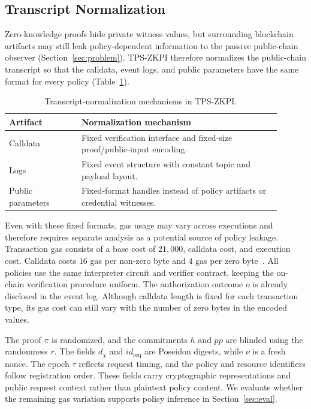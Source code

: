 \subsection{Transcript Normalization}
\label{subsec:transcript-normalization}

Zero-knowledge proofs hide private witness values, but surrounding blockchain artifacts may still leak policy-dependent information to the passive public-chain observer (Section~\ref{sec:problem}).
TPS-ZKPI therefore normalizes the public-chain transcript so that the calldata, event logs, and public parameters have the same format for every policy (Table~\ref{tab:transcript-normalization}).

\begin{table}[htbp]
	\centering
	\caption{Transcript-normalization mechanisms in TPS-ZKPI.}
	\label{tab:transcript-normalization} \footnotesize
	\begin{tabular}{p{0.24\linewidth}p{0.66\linewidth}}
		\hline
		\textbf{Artifact} & \textbf{Normalization mechanism}                                          \\
		\hline
		Calldata          & Fixed verification interface and fixed-size proof/public-input encoding.  \\
		Logs              & Fixed event structure with constant topic and payload layout.             \\
		Public parameters & Fixed-format handles instead of policy artifacts or credential witnesses. \\
		\hline
	\end{tabular}
\end{table}

Even with these fixed formats, gas usage may vary across executions and therefore requires separate analysis as a potential source of policy leakage.
Transaction gas consists of a base cost of $21{,}000$, calldata cost, and execution cost.
Calldata costs $16$ gas per non-zero byte and $4$ gas per zero byte~\cite{akhunov2019eip2028}.
All policies use the same interpreter circuit and verifier contract, keeping the on-chain verification procedure uniform.
The authorization outcome $o$ is already disclosed in the event log.
Although calldata length is fixed for each transaction type, its gas cost can still vary with the number of zero bytes in the encoded values.

The proof $\pi$ is randomized, and the commitments $h$ and $\mathit{pp}$ are blinded using the randomness $r$.
The fields $d_{\chi}$ and $\mathit{id}_{\mathrm{req}}$ are Poseidon digests, while $\nu$ is a fresh nonce.
The epoch $\tau$ reflects request timing, and the policy and resource identifiers follow registration order.
These fields carry cryptographic representations and public request context rather than plaintext policy content.
We evaluate whether the remaining gas variation supports policy inference in Section~\ref{sec:eval}.
